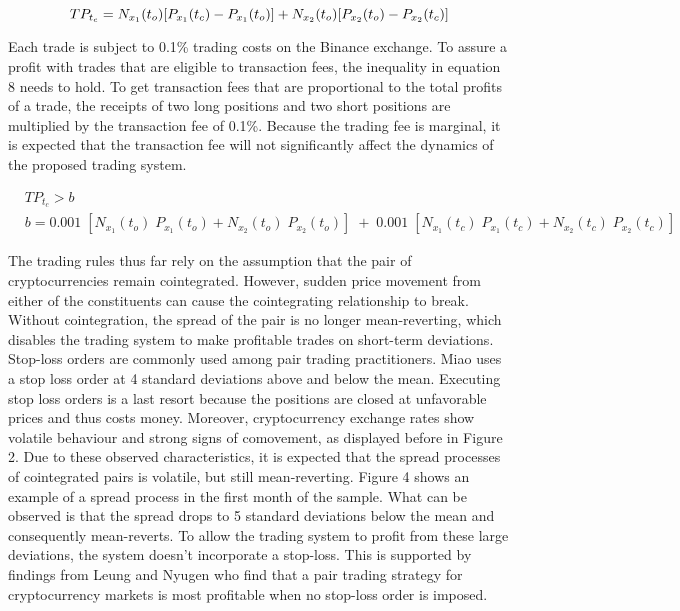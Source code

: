 \documentclass[12pt,english,authoryear]{article}
\begin{document}
\begin{equation}
TP_{t_c}=N_{x_1}(t_o)[P_{x_1}(t_c)-P_{x_1}(t_o)]+N_{x_2}(t_o)[P_{x_2}(t_o)-P_{x_2}(t_c)]\\
\end{equation}

Each trade is subject to 0.1\% trading costs on the Binance exchange. To assure a profit with trades that are eligible to transaction fees, the inequality in equation 8 needs to hold. To get transaction fees that are proportional to the total profits of a trade, the receipts of two long positions and two short positions are multiplied by the transaction fee of 0.1\%. Because the trading fee is marginal, it is expected that the transaction fee will not significantly affect the dynamics of the proposed trading system. 

\begin{equation}
    \begin{aligned}
        &TP_{t_c}>b \\
        &b= 0.001 \; [N_{x_1}(t_o) \;P_{x_1}(t_o) + N_{x_2}(t_o) \;P_{x_2}(t_o)]\;+\;0.001 \; [N_{x_1}(t_c) \;P_{x_1}(t_c) + N_{x_2}(t_c) \;P_{x_2}(t_c)] 
    \end{aligned}
\end{equation}

The trading rules thus far rely on the assumption that the pair of cryptocurrencies remain cointegrated. However, sudden price movement from either of the constituents can cause the cointegrating relationship to break. Without cointegration, the spread of the pair is no longer mean-reverting, which disables the trading system to make profitable trades on short-term deviations. Stop-loss orders are commonly used among pair trading practitioners. Miao \citeyear{Miao_2014} uses a stop loss order at 4 standard deviations above and below the mean. Executing stop loss orders is a last resort because the positions are closed at unfavorable prices and thus costs money. Moreover, cryptocurrency exchange rates show volatile behaviour and strong signs of comovement, as displayed before in Figure 2. Due to these observed characteristics, it is expected that the spread processes of cointegrated pairs is volatile, but still mean-reverting. Figure 4 shows an example of a spread process in the first month of the sample. What can be observed is that the spread drops to 5 standard deviations below the mean and consequently mean-reverts. To allow the trading system to profit from these large deviations, the system doesn't incorporate a stop-loss. This is supported by findings from Leung and Nyugen \citeyear{Leung_2018} who find that a pair trading strategy for cryptocurrency markets is most profitable when no stop-loss order is imposed. 
\end{document}
